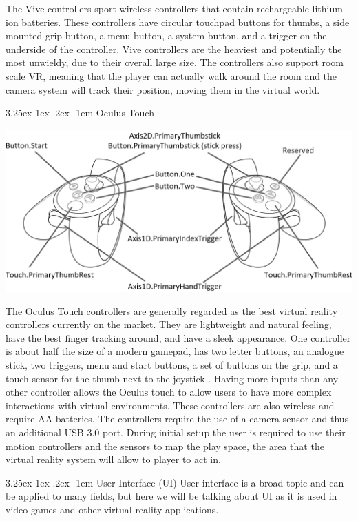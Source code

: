 \documentclass[onecolumn, draftclsnofoot,10pt, compsoc]{IEEEtran}
\makeatletter
\renewcommand\paragraph{\@startsection{paragraph}{5}{\z@}%
  {3.25ex \@plus1ex \@minus.2ex}%
  {-1em}%
  {\normalfont\normalsize\bfseries}}
\renewcommand\subparagraph{\@startsection{subparagraph}{6}{\parindent}%
  {3.25ex \@plus1ex \@minus .2ex}%
  {-1em}%
  {\normalfont\normalsize\bfseries}}
\makeatother
\begin{document}
The Vive controllers sport wireless controllers that contain rechargeable lithium ion batteries. These controllers have circular touchpad buttons for thumbs, a side mounted grip button, a menu button, a system button, and a trigger on the underside of the controller. Vive controllers are the heaviest and potentially the most unwieldy, due to their overall large size. The controllers also support room scale VR, meaning that the player can actually walk around the room and the camera system will track their position, moving them in the virtual world. 

\subparagraph{Oculus Touch}
\begin{center}
\includegraphics[scale=.30]{oculusController.png}
\end{center}

The Oculus Touch controllers are generally regarded as the best virtual reality controllers currently on the market. They are lightweight and natural feeling, have the best finger tracking around, and have a sleek appearance. One controller is about half the size of a modern gamepad, has two letter buttons, an analogue stick, two triggers, menu and start buttons, a set of buttons on the grip, and a touch sensor for the thumb next to the joystick \cite{controllerCompare}. Having more inputs than any other controller allows the Oculus touch to allow users to have more complex interactions with virtual environments. These controllers are also wireless and require AA batteries. The controllers require the use of a camera sensor and thus an additional USB 3.0 port. During initial setup the user is required to use their motion controllers and the sensors to map the play space, the area that the virtual reality system will allow to player to act in. 

\paragraph{User Interface (UI)}
User interface is a broad topic and can be applied to many fields, but here we will be talking about UI as it is used in video games and other virtual reality applications. 
\end{document}
